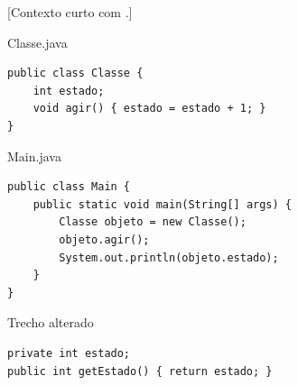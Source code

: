 \documentclass[11pt,a4paper]{article}
\begin{document}
\cabecalhoAvaliacao
\begin{quadroRespostas}
\end{quadroRespostas}
[Contexto curto com .]
\noindent\begin{minipage}[t]{.39\textwidth}
\begin{painelreferencia}{Classe.java}
\begin{lstlisting}[style=cenariocodigo]
public class Classe {
    int estado;
    void agir() { estado = estado + 1; }
}
\end{lstlisting}
\end{painelreferencia}
\end{minipage}\hfill
\begin{minipage}[t]{.59\textwidth}
\begin{painelreferencia}{Main.java}
\begin{lstlisting}[style=cenariocodigo]
public class Main {
    public static void main(String[] args) {
        Classe objeto = new Classe();
        objeto.agir();
        System.out.println(objeto.estado);
    }
}
\end{lstlisting}
\end{painelreferencia}
\end{minipage}
\inicioQuestoes
{}
\newpage
{}
\begin{painelEvolucao}{Trecho alterado}
\begin{lstlisting}[style=evolucaocodigo]
private int estado;
public int getEstado() { return estado; }
\end{lstlisting}
\end{painelEvolucao}
\end{document}
